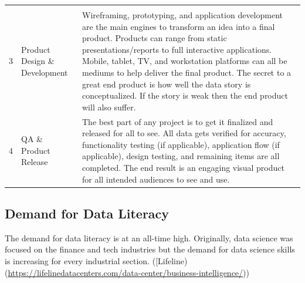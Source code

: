 \documentclass[]{book}
\begin{document}
\begin{longtable}[]{@{}lll@{}}
\begin{minipage}[t]{0.76\columnwidth}
\end{minipage}\tabularnewline
\begin{minipage}[t]{0.04\columnwidth}\raggedright
3\strut
\end{minipage} & \begin{minipage}[t]{0.11\columnwidth}\raggedright
Product Design \& Development\strut
\end{minipage} & \begin{minipage}[t]{0.76\columnwidth}\raggedright
Wireframing, prototyping, and application development are the main engines to transform an idea into a final product. Products can range from static presentations/reports to full interactive applications. Mobile, tablet, TV, and workstation platforms can all be mediums to help deliver the final product. The secret to a great end product is how well the data story is conceptualized. If the story is weak then the end product will also suffer.\strut
\end{minipage}\tabularnewline
\begin{minipage}[t]{0.04\columnwidth}\raggedright
4\strut
\end{minipage} & \begin{minipage}[t]{0.11\columnwidth}\raggedright
QA \& Product Release\strut
\end{minipage} & \begin{minipage}[t]{0.76\columnwidth}\raggedright
The best part of any project is to get it finalized and released for all to see. All data gets verified for accuracy, functionality testing (if applicable), application flow (if applicable), design testing, and remaining items are all completed. The end result is an engaging visual product for all intended audiences to see and use.\strut
\end{minipage}\tabularnewline
\bottomrule
\end{longtable}

\hypertarget{demand-for-data-literacy}{%
\subsection{Demand for Data Literacy}\label{demand-for-data-literacy}}

The demand for data literacy is at an all-time high. Originally, data science was focused on the finance and tech industries but the demand for data science skills is increasing for every industrial section. ({[}Lifeline)(\url{https://lifelinedatacenters.com/data-center/business-intelligence/}))
\end{document}
